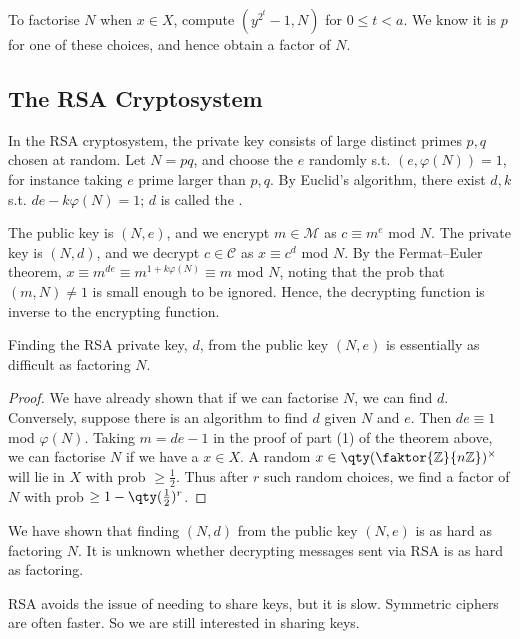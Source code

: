 To factorise $N$ when $x \in X$, compute $(y^{2^t}-1, N)$ for $0 \leq t < a$.
We know it is $p$ for one of these choices, and hence obtain a factor of $N$.

\subsection{The RSA Cryptosystem}

In the RSA cryptosystem, the private key consists of large distinct primes $p, q$ chosen at random.
Let $N = pq$, and choose the  $e$ randomly s.t. $(e, \varphi(N)) = 1$, for instance taking $e$ prime larger than $p, q$.
By Euclid's algorithm, there exist $d, k$ s.t. $de - k\varphi(N) = 1$; $d$ is called the .

The public key is $(N, e)$, and we encrypt $m \in \mathcal M$ as $c \equiv m^e$ mod $N$.
The private key is $(N, d)$, and we decrypt $c \in \mathcal C$ as $x \equiv c^d$ mod $N$.
By the Fermat--Euler theorem, $x \equiv m^{de} \equiv m^{1+k\varphi(N)} \equiv m$ mod $N$, noting that the prob that $(m, N) \neq 1$ is small enough to be ignored.
Hence, the decrypting function is inverse to the encrypting function.
%
\begin{corollary}
    Finding the RSA private key, $d$, from the public key $(N, e)$ is essentially as difficult as factoring $N$.
\end{corollary}

\begin{proof}
    We have already shown that if we can factorise $N$, we can find $d$.
    Conversely, suppose there is an algorithm to find $d$ given $N$ and $e$.
    Then $de \equiv 1$ mod $\varphi(N)$.
    Taking $m = de-1$ in the proof of part (1) of the theorem above, we can factorise $N$ if we have a $x \in X$.
    A random $x \in \qty(\faktor{\mathbb{Z}}{n \mathbb{Z}})^\times$ will lie in $X$ with prob $\geq \frac{1}{2}$.
    Thus after $r$ such random choices, we find a factor of $N$ with prob $\geq 1 - \qty(\frac{1}{2})^r$.
\end{proof}

\begin{remark}
    We have shown that finding $(N, d)$ from the public key $(N, e)$ is as hard as factoring $N$.
    It is unknown whether decrypting messages sent via RSA is as hard as factoring.

    RSA avoids the issue of needing to share keys, but it is slow.
    Symmetric ciphers are often faster.
    So we are still interested in sharing keys.
\end{remark}

